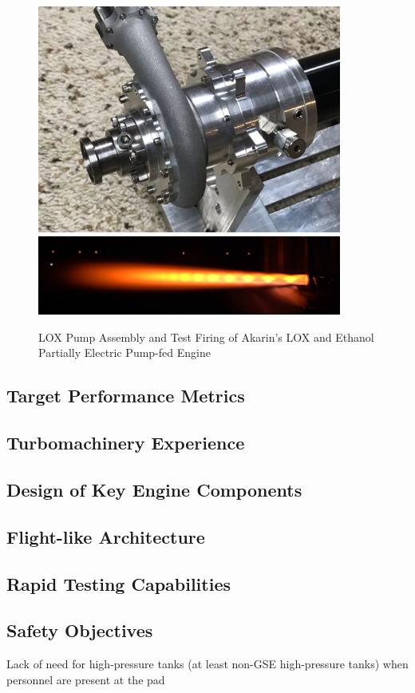 \documentclass[12pt, letterpaper]{article}
\begin{document}
\begin{figure}[t]
    \centering
    \includegraphics[width=10cm]{Pump_LOX_reddit.jpeg}
    \includegraphics[width=10cm]{ElectricPumpFedReddit.jpg}
    \caption{LOX Pump Assembly and Test Firing of Akarin's LOX and Ethanol Partially Electric Pump-fed Engine}
\end{figure}


\newpage

\subsection{Target Performance Metrics}
\subsection{Turbomachinery Experience}
\subsection{Design of Key Engine Components}
\subsection{Flight-like Architecture}
\subsection{Rapid Testing Capabilities}
\subsection{Safety Objectives}
Lack of need for high-pressure tanks (at least non-GSE high-pressure tanks) when personnel are present at the pad
\end{document}
